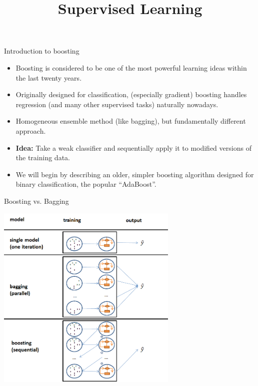 \documentclass[11pt,compress,t,notes=noshow, xcolor=table]{beamer}
\title{Supervised Learning}
\date{}
\begin{document}


\begin{vbframe}{Introduction to boosting}
  \begin{itemize}
    \item
      Boosting is considered to be one of the most powerful learning ideas within the last twenty years.
    \item
      Originally designed for classification, (especially gradient) boosting handles regression (and many other supervised tasks) naturally nowadays.
    \item
      Homogeneous ensemble method (like bagging), but fundamentally different approach.
    \item
      {\bf Idea:} Take a weak classifier and sequentially apply it to modified versions of the training data.
    \item
      We will begin by describing an older, simpler boosting algorithm designed for binary classification, the popular \enquote{AdaBoost}.
  \end{itemize}
\end{vbframe}


\begin{vbframe}{Boosting vs. Bagging}

\begin{center}
\includegraphics[width=0.65\textwidth]{figure_man/bagging_vs_boosting.png}
\end{center}


\end{vbframe}
\end{document}
